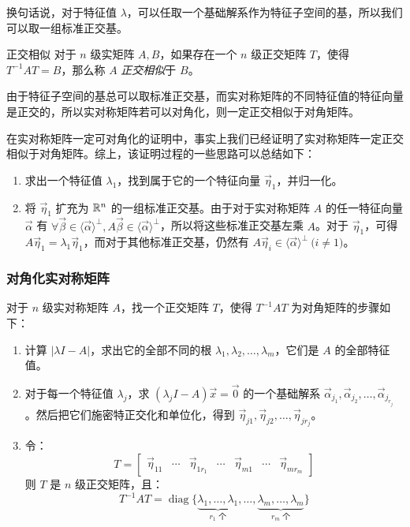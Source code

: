 换句话说，对于特征值 $\lambda$，可以任取一个基础解系作为特征子空间的基，所以我们可以取一组标准正交基。

\begin{definition}{正交相似}
	对于 $n$ 级实矩阵 $A, B$，如果存在一个 $n$ 级正交矩阵 $T$，使得 $T^{-1} A T = B$，那么称 $A$ \emph{正交相似}于 $B$。
\end{definition}

由于特征子空间的基总可以取标准正交基，而实对称矩阵的不同特征值的特征向量是正交的，所以实对称矩阵若可以对角化，则一定正交相似于对角矩阵。

在实对称矩阵一定可对角化的证明中，事实上我们已经证明了实对称矩阵一定正交相似于对角矩阵。综上，该证明过程的一些思路可以总结如下：
\begin{enumerate}
	\item 求出一个特征值 $\lambda_1$，找到属于它的一个特征向量 $\vec \eta_1$，并归一化。
	\item 将 $\vec \eta_1$ 扩充为 $\mathbb R^n$ 的一组标准正交基。由于对于实对称矩阵 $A$ 的任一特征向量 $\vec \alpha$ 有 $\forall \vec \beta \in \langle \vec \alpha \rangle^\perp, A \vec \beta \in \langle \vec \alpha \rangle^\perp$，所以将这些标准正交基左乘 $A$。对于 $\vec \eta_1$，可得 $A \vec \eta_1 = \lambda_1 \vec \eta_1$，而对于其他标准正交基，仍然有 $A \vec \eta_i \in \langle \vec \alpha \rangle^\perp \pod{i \ne 1}$。
\end{enumerate}

\subsubsection{对角化实对称矩阵}

对于 $n$ 级实对称矩阵 $A$，找一个正交矩阵 $T$，使得 $T^{-1} A T$ 为对角矩阵的步骤如下：

\begin{enumerate}
	\item 计算 $|\lambda I - A|$，求出它的全部不同的根 $\lambda_1, \lambda_2, \ldots, \lambda_m$，它们是 $A$ 的全部特征值。
	\item 对于每一个特征值 $\lambda_j$，求 $(\lambda_j I - A) \vec x = \vec 0$ 的一个基础解系 $\vec \alpha_{j_1}, \vec \alpha_{j_2}, \ldots, \vec \alpha_{j_{r_j}}$。然后把它们施密特正交化和单位化，得到 $\vec \eta_{j1}, \vec \eta_{j2}, \ldots, \vec \eta_{j r_j}$。
	\item 令：
	$$
	T =
	\begin{bmatrix}
		\vec \eta_{11} & \cdots & \vec \eta_{1 r_1} & \cdots & \vec \eta_{m1} & \cdots & \vec \eta_{m r_m}
	\end{bmatrix}
	$$
	则 $T$ 是 $n$ 级正交矩阵，且：
	$$
	T^{-1} A T = \operatorname{diag} \{\underset{\text{$r_1$ 个}}{\underbrace{\lambda_1, \ldots, \lambda_1}}, \ldots, \underset{\text{$r_m$ 个}}{\underbrace{\lambda_m, \ldots, \lambda_m}}\}
	$$
\end{enumerate}


